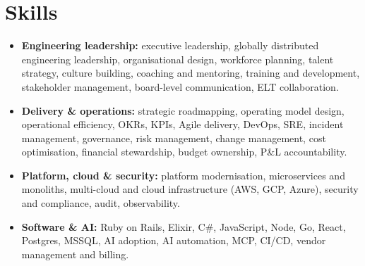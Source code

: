 \documentclass[12pt]{article}
\begin{document}
\section*{Skills}

\begin{itemize}
  \item \textbf{Engineering leadership:} executive leadership, globally distributed engineering leadership, organisational design, workforce planning, talent strategy, culture building, coaching and mentoring, training and development, stakeholder management, board-level communication, ELT collaboration.
  
  \item \textbf{Delivery \& operations:} strategic roadmapping, operating model design, operational efficiency, OKRs, KPIs, Agile delivery, DevOps, SRE, incident management, governance, risk management, change management, cost optimisation, financial stewardship, budget ownership, P\&L accountability.
  
  \item \textbf{Platform, cloud \& security:} platform modernisation, microservices and monoliths, multi-cloud and cloud infrastructure (AWS, GCP, Azure), security and compliance, audit, observability.
  
  \item \textbf{Software \& AI:} Ruby on Rails, Elixir, C\#, JavaScript, Node, Go, React, Postgres, MSSQL, AI adoption, AI automation, MCP, CI/CD, vendor management and billing.
\end{itemize}
\end{document}
